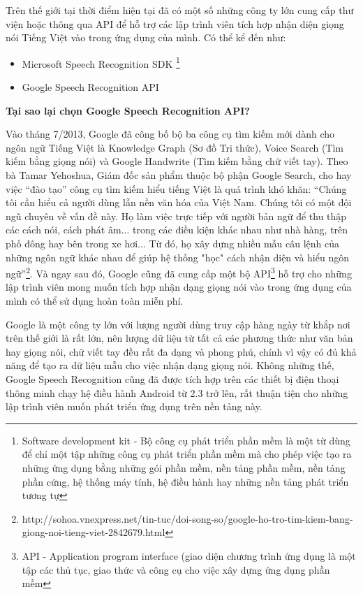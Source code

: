 \documentclass[12pt]{report}
\begin{document}
Trên thế giới tại thời điểm hiện tại đã có một số những công ty lớn cung cấp thư viện hoặc thông qua API để hỗ trợ các lập trình viên tích hợp nhận diện giọng nói Tiếng Việt vào trong ứng dụng của mình. Có thể kể đến như:

\begin{itemize}
	\item Microsoft Speech Recognition SDK \footnote{Software development kit - Bộ công cụ phát triển phần mềm là một từ dùng để chỉ một tập những công cụ phát triển phần mềm mà cho phép việc tạo ra những ứng dụng bằng những gói phần mềm, nền tảng phần mềm, nền tảng phần cứng, hệ thống máy tính, hệ điều hành hay những nền tảng phát triển tương tự}
	\item Google Speech Recognition API
\end{itemize}

\noindent \textbf{Tại sao lại chọn Google Speech Recognition API?}

\noindent Vào tháng 7/2013, Google đã công bố bộ ba công cụ tìm kiếm mới dành cho ngôn ngữ Tiếng Việt là Knowledge Graph (Sơ đồ Tri thức), Voice Search (Tìm kiếm bằng giọng nói) và Google Handwrite (Tìm kiếm bằng chữ viết tay). Theo bà Tamar Yehoshua, Giám đốc sản phẩm thuộc bộ phận Google Search, cho hay việc ``đào tạo'' công cụ tìm kiếm hiểu tiếng Việt là quá trình khó khăn: ``Chúng tôi cần hiểu cả người dùng lẫn nền văn hóa của Việt Nam. Chúng tôi có một đội ngũ chuyên về vấn đề này. Họ làm việc trực tiếp với người bản ngữ để thu thập các cách nói, cách phát âm... trong các điều kiện khác nhau như nhà hàng, trên phố đông hay bên trong xe hơi... Từ đó, họ xây dựng nhiều mẫu câu lệnh của những ngôn ngữ khác nhau để giúp hệ thống "học" cách nhận diện và hiểu ngôn ngữ''{\footnote{http://sohoa.vnexpress.net/tin-tuc/doi-song-so/google-ho-tro-tim-kiem-bang-giong-noi-tieng-viet-2842679.html}}. Và ngay sau đó, Google cũng đã cung cấp một bộ API{\footnote{API - Application program interface (giao diện chương trình ứng dụng là một tập các thủ tục, giao thức và công cụ cho việc xây dựng ứng dụng phần mềm}} hỗ trợ cho những lập trình viên mong muốn tích hợp nhận dạng giọng nói vào trong ứng dụng của mình có thể sử dụng hoàn toàn miễn phí.

Google là một công ty lớn với lượng người dùng truy cập hàng ngày từ khắp nơi trên thế giới là rất lớn, nên lượng dữ liệu từ tất cả các phương thức như văn bản hay giọng nói, chữ viết tay đều rất đa dạng và phong phú, chính vì vậy có đủ khả năng để tạo ra dữ liệu mẫu cho việc nhận dạng giọng nói. Không những thế, Google Speech Recognition cũng đã được tích hợp trên các thiết bị điện thoại thông minh chạy hệ điều hành Android từ 2.3 trở lên, rất thuận tiện cho những lập trình viên muốn phát triển ứng dụng trên nền tảng này.
\end{document}
